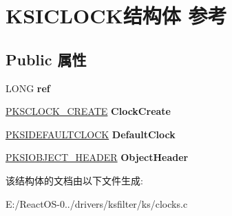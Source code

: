 \hypertarget{struct_k_s_i_c_l_o_c_k}{}\section{K\+S\+I\+C\+L\+O\+C\+K结构体 参考}
\label{struct_k_s_i_c_l_o_c_k}
\subsection*{Public 属性}
\begin{DoxyCompactItemize}
\item 
\mbox{\label{struct_k_s_i_c_l_o_c_k_a6982fcc8f87531bd07436b9a148faf11}} 
L\+O\+NG {\bfseries ref}
\item 
\mbox{\label{struct_k_s_i_c_l_o_c_k_ae58a50a685fb7e4acb4a5d9f45ac42c5}} 
\hyperlink{struct_k_s_c_l_o_c_k___c_r_e_a_t_e}{P\+K\+S\+C\+L\+O\+C\+K\+\_\+\+C\+R\+E\+A\+TE} {\bfseries Clock\+Create}
\item 
\mbox{\label{struct_k_s_i_c_l_o_c_k_a0f5463532b609e419dd28f7e32623152}} 
\hyperlink{struct_k_s_i_d_e_f_a_u_l_t_c_l_o_c_k}{P\+K\+S\+I\+D\+E\+F\+A\+U\+L\+T\+C\+L\+O\+CK} {\bfseries Default\+Clock}
\item 
\mbox{\label{struct_k_s_i_c_l_o_c_k_a068274db24a62a53779872ba9cfd84f5}} 
\hyperlink{struct_k_s_i_o_b_j_e_c_t___h_e_a_d_e_r}{P\+K\+S\+I\+O\+B\+J\+E\+C\+T\+\_\+\+H\+E\+A\+D\+ER} {\bfseries Object\+Header}
\end{DoxyCompactItemize}


该结构体的文档由以下文件生成\+:\begin{DoxyCompactItemize}
\item 
E\+:/\+React\+O\+S-\/0../drivers/ksfilter/ks/clocks.\+c\end{DoxyCompactItemize}
